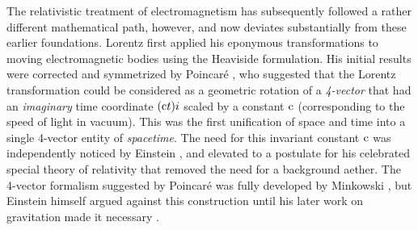 \documentclass[1p,sort&compress]{elsarticle}
\numberwithin{equation}{section}
\newcommand{\cc}{{\rm c}}
\begin{document}
The relativistic treatment of electromagnetism has subsequently followed a rather different mathematical path, however, and now deviates substantially from these earlier foundations.  Lorentz \cite{Lorentz1899,Lorentz1904,Lorentz1904b} first applied his eponymous transformations to moving electromagnetic bodies using the Heaviside formulation.  His initial results were corrected and symmetrized by Poincar\'e \cite{Poincare1905,Poincare1906}, who suggested that the Lorentz transformation could be considered as a geometric rotation of a \emph{4-vector} that had an \emph{imaginary} time coordinate $(\cc t)i$ scaled by a constant $\cc$ (corresponding to the speed of light in vacuum).  This was the first unification of space and time into a single 4-vector entity of \emph{spacetime}.  The need for this invariant constant $\cc$ was independently noticed by Einstein \cite{Einstein1905}, and elevated to a postulate for his celebrated special theory of relativity that removed the need for a background aether.  The 4-vector formalism suggested by Poincar\'e was fully developed by Minkowski \cite{Minkowski1907}, but Einstein himself argued against this construction \cite{Einstein1908} until his later work on gravitation made it necessary \cite{Einstein1912}.
\end{document}

